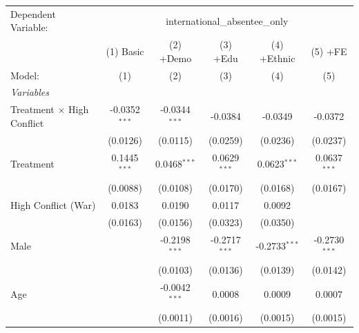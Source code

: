 
\begingroup
\centering
\begin{tabular}{lccccc}
   \tabularnewline \midrule \midrule
   Dependent Variable: & \multicolumn{5}{c}{international\_absentee\_only}\\
                                     & (1) Basic       & (2) +Demo               & (3) +Edu                       & (4) +Ethnic                    & (5) +FE \\   
   Model:                            & (1)             & (2)                     & (3)                            & (4)                            & (5)\\  
   \midrule
   \emph{Variables}\\
   Treatment $\times$ High Conflict  & -0.0352$^{***}$ & -0.0344$^{***}$         & -0.0384                        & -0.0349                        & -0.0372\\   
                                     & (0.0126)        & (0.0115)                & (0.0259)                       & (0.0236)                       & (0.0237)\\   
   Treatment                         & 0.1445$^{***}$  & 0.0468$^{***}$          & 0.0629$^{***}$                 & 0.0623$^{***}$                 & 0.0637$^{***}$\\   
                                     & (0.0088)        & (0.0108)                & (0.0170)                       & (0.0168)                       & (0.0167)\\   
   High Conflict (War)               & 0.0183          & 0.0190                  & 0.0117                         & 0.0092                         &   \\   
                                     & (0.0163)        & (0.0156)                & (0.0323)                       & (0.0350)                       &   \\   
   Male                              &                 & -0.2198$^{***}$         & -0.2717$^{***}$                & -0.2733$^{***}$                & -0.2730$^{***}$\\   
                                     &                 & (0.0103)                & (0.0136)                       & (0.0139)                       & (0.0142)\\   
   Age                               &                 & -0.0042$^{***}$         & 0.0008                         & 0.0009                         & 0.0007\\   
                                     &                 & (0.0011)                & (0.0016)                       & (0.0015)                       & (0.0015)\\   

\end{tabular}

